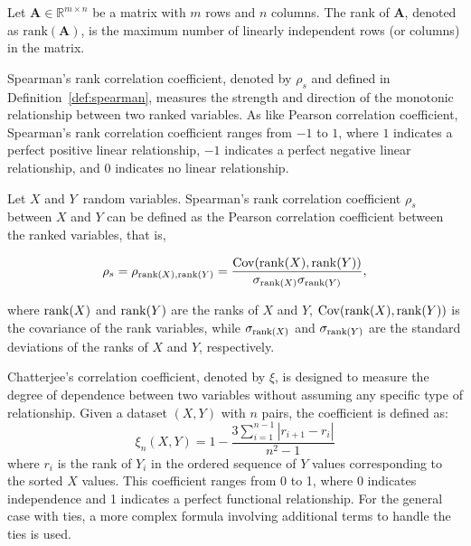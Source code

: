 \begin{definition} \label{def:matrix_rank}
Let $\mathbf{A} \in \mathbb{R}^{m \times n}$ be a matrix with $m$ rows and $n$ columns. The rank of $\mathbf{A}$, denoted as $\text{rank}(\mathbf{A})$, is the maximum number of linearly independent rows (or columns) in the matrix.
\end{definition}

Spearman's rank correlation coefficient, denoted by $\rho_s$ and defined in Definition~\ref{def:spearman}, measures the strength and direction of the monotonic relationship between two ranked variables.  As like Pearson correlation coefficient, Spearman's rank correlation coefficient ranges from $-1$ to $1$, where $1$ indicates a perfect positive linear relationship, $-1$ indicates a perfect negative linear relationship, and $0$ indicates no linear relationship.
 
\begin{definition}\label{def:spearman}
Let  $X$ and $Y$\ random variables. Spearman's rank correlation coefficient  $\rho_s$ between $X$ and $Y$ can be defined as the Pearson correlation coefficient between the ranked variables, that is, 

\begin{equation}\label{eq:spearman}
\rho_s = \rho_{\operatorname{rank}(X),\operatorname{rank}(Y)} = \frac{\mathrm{Cov}(\operatorname{rank}(X), \operatorname{rank}(Y))}{\sigma_{\operatorname{rank}(X)} \sigma_{\operatorname{rank}(Y)}},
\end{equation}

where $\operatorname{rank}(X)$ and $\operatorname{rank}(Y)$ are the ranks of $X$ and $Y$, $\mathrm{Cov}(\operatorname{rank}(X), \operatorname{rank}(Y))$ is the covariance of the rank variables, while $\sigma_{\operatorname{rank}(X)}$ and $\sigma_{\operatorname{rank}(Y)}$ are the standard deviations of the ranks of $X$ and $Y$, respectively.
\end{definition}

Chatterjee's correlation coefficient, denoted by $\xi$, is designed to measure the degree of dependence between two variables without assuming any specific type of relationship. Given a dataset $(X, Y)$ with $n$ pairs, the coefficient is defined as:
\begin{equation}
\xi_n(X,Y) = 1 - \frac{3 \sum_{i=1}^{n-1} |r_{i+1} - r_i|}{n^2 - 1}
\end{equation}
where $r_i$ is the rank of $Y_i$ in the ordered sequence of $Y$ values corresponding to the sorted $X$ values. This coefficient ranges from 0 to 1, where 0 indicates independence and 1 indicates a perfect functional relationship. For the general case with ties, a more complex formula involving additional terms to handle the ties is used.


